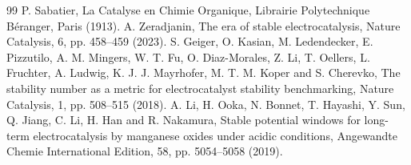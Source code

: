 \documentclass[11pt,a4paper]{article}
\begin{document}
\begin{thebibliography}{99}
P. Sabatier, La Catalyse en Chimie Organique, Librairie Polytechnique B\'eranger, Paris (1913).
%
A. Zeradjanin, The era of stable electrocatalysis, Nature Catalysis, 6, pp. 458--459 (2023).
%
S. Geiger, O. Kasian, M. Ledendecker, E. Pizzutilo, A. M. Mingers, W. T. Fu, O. Diaz-Morales, Z. Li, T. Oellers, L. Fruchter, A. Ludwig, K. J. J. Mayrhofer, M. T. M. Koper and S. Cherevko, The stability number as a metric for electrocatalyst stability benchmarking, Nature Catalysis, 1, pp. 508--515 (2018).
%
A. Li, H. Ooka, N. Bonnet, T. Hayashi, Y. Sun, Q. Jiang, C. Li, H. Han and  R. Nakamura, Stable potential windows for long-term electrocatalysis by manganese oxides under acidic conditions, Angewandte Chemie International Edition, 58, pp. 5054--5058 (2019).


\end{thebibliography}
\end{document}
